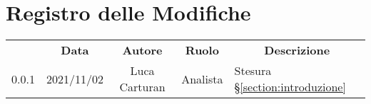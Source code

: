 \thispagestyle{empty}
\section*{Registro delle Modifiche}

\begin{center}
\renewcommand{\arraystretch}{1.8}
\begin{longtable}[c]{c | c | c | c | p{5cm}}
\rowcolor[HTML]{125E28}
\multicolumn{1}{c}{\color[HTML]{FFFFFF} \textbf{Versione}} & 
\multicolumn{1}{c}{\color[HTML]{FFFFFF} \textbf{Data}} & 
\multicolumn{1}{c}{\color[HTML]{FFFFFF} \textbf{Autore}} & 
\multicolumn{1}{c}{\color[HTML]{FFFFFF} \textbf{Ruolo}} & 
\multicolumn{1}{c}{\color[HTML]{FFFFFF} \textbf{Descrizione}} \\





0.0.1 & 2021/11/02 & Luca Carturan & Analista & Stesura §\ref{section:introduzione} \\

\end{longtable}

\end{center}